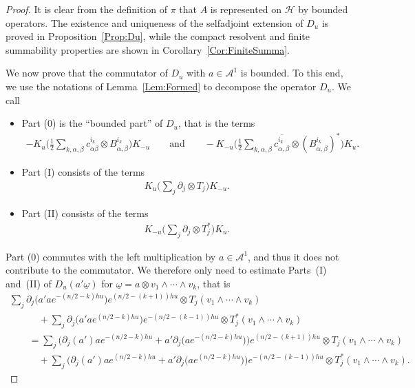 \documentclass[11pt]{article}
\newcommand{\Aa}{\mathcal{A}}
\newcommand{\Hh}{\mathscr{H}}
\newcommand{\omegat}{\underline{\omega}}
\numberwithin{equation}{section}
\begin{document}
\begin{proof}
It is clear from the def\/inition of $\pi$ that $A$ is represented on $\Hh$ by bounded operators. The existence and uniqueness of the selfadjoint extension of $D_u$ is proved in Proposition~\ref{Prop:Du}, while the compact resolvent and f\/inite summability properties are shown in Corollary~\ref{Cor:FiniteSumma}.

We now prove that the commutator of $D_u$ with $a \in \Aa^1$ is bounded. To this end, we use the notations of Lemma~\ref{Lem:Formed} to decompose the operator $D_u$. We call
\begin{itemize}\itemsep=0pt
\item
Part (0) is the ``bounded part'' of $D_u$, that is the terms
\begin{gather*}
 - K_u \bigg( \frac{1}{2} \sum_{k,\alpha,\beta} c^{i_k}_{\alpha \beta} \otimes B^{i_k}_{\alpha,\beta} \bigg) K_{-u}
\qquad
\text{and}
\qquad
- K_{-u} \bigg( \frac{1}{2} \sum_{k,\alpha,\beta} \overline{c^{i_k}_{\alpha, \beta}} \otimes (B^{i_k}_{\alpha, \beta})^* \bigg) K_{u}.
\end{gather*}
\item
Part (I) consists of the terms
\begin{gather*}
K_u \bigg( \sum_{j} \partial _j \otimes T_j \bigg) K_{-u}.
\end{gather*}
\item
Part (II) consists of the terms
\begin{gather*}
K_{-u} \bigg( \sum_{j} \partial _j \otimes T_j^* \bigg) K_{u}.
\end{gather*}
\end{itemize}
Part (0) commutes with the left multiplication by $a \in \Aa^1$, and thus it does not contribute to the commutator. We therefore only need to estimate Parts~(I) and~(II) of $D_u( a' \omegat)$ for $\omegat = a \otimes v_1 \wedge \cdots \wedge v_k$, that is
\begin{gather*}
\sum_j \partial_j\big( a' a e^{-(n/2 - k)h u} \big) e^{(n/2 - (k+1))h u} \otimes T_j( v_1 \wedge \cdots \wedge v_k) \\
\qquad\quad{}
+ \sum_j \partial_j\big( a' a e^{(n/2 - k)h u} \big) e^{-(n/2 - (k-1))h u} \otimes T_j^*( v_1 \wedge \cdots \wedge v_k)\\
\qquad{}
= \sum_j \big(\partial_j( a') a e^{-(n/2 - k)h u} + a' \partial_j\big(a e^{-(n/2 - k)h u}\big)\big) e^{(n/2 - (k+1))h u}
\otimes T_j( v_1 \wedge \cdots \wedge v_k) \\
\qquad\quad{}
+ \sum_j \big(\partial_j( a') a e^{(n/2 - k)h u} + a' \partial_j\big(a e^{(n/2 - k)h u}\big)\big) e^{-(n/2 - (k-1))h u} \otimes T_j^*( v_1 \wedge \cdots \wedge v_k).

\end{gather*}
\end{proof}
\end{document}
